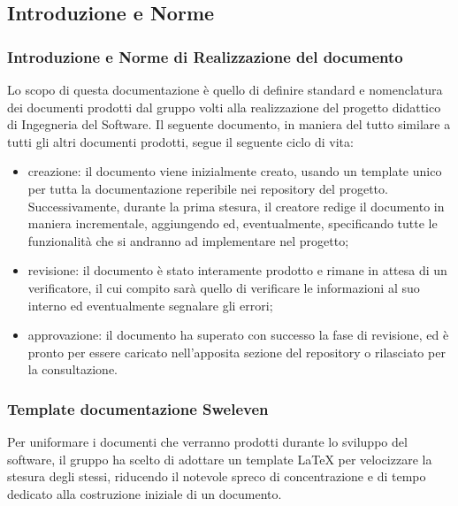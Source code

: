 \subsection{Introduzione e Norme}
\subsubsection{Introduzione e Norme di Realizzazione del documento}
Lo scopo di questa documentazione è quello di definire standard e nomenclatura dei documenti prodotti dal gruppo {\Gruppo}  volti alla realizzazione del progetto didattico di Ingegneria del Software.
Il seguente documento, in maniera del tutto similare a tutti gli altri documenti prodotti, segue il seguente ciclo di vita:
\begin{itemize}
\item creazione: il documento viene inizialmente creato, usando un template unico per tutta la documentazione reperibile nei repository del progetto. Successivamente, durante la prima stesura, il creatore redige il documento in maniera incrementale, aggiungendo ed, eventualmente, specificando tutte le funzionalità che si andranno ad implementare nel progetto;
\item revisione: il documento è stato interamente prodotto e rimane in attesa di un verificatore, il cui compito sarà quello di verificare le informazioni al suo interno ed eventualmente segnalare gli errori;
\item approvazione: il documento ha superato con successo la fase di revisione, ed è pronto per essere caricato nell’apposita sezione del repository o rilasciato per la consultazione.
\end{itemize}
\subsubsection{Template documentazione Sweleven}
Per uniformare i documenti che verranno prodotti durante lo sviluppo del software, il gruppo ha scelto di adottare un template \LaTeX{} per velocizzare la stesura degli stessi, riducendo il notevole spreco di concentrazione e di tempo dedicato alla costruzione iniziale di un documento.

